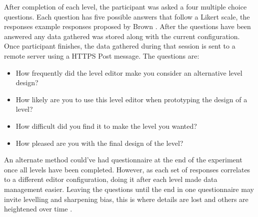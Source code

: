 \documentclass[journal]{IEEEtran}
\begin{document}
 After completion of each level, the participant was asked a four multiple choice questions. Each question  has five possible answers that follow a Likert scale, the responses example responses proposed by Brown \cite{brown2010likert}. After the questions have been answered any data gathered was stored along with the current configuration. Once participant finishes, the data gathered during that session is sent to a remote server using a HTTPS Post message.
 The questions are:
\begin{itemize}
    \item How frequently did the level editor make you consider an alternative level design?
    
    \item How likely are you to use this level editor when prototyping the design of a level?

   \item How difficult did you find it to make the level you wanted?

    \item How pleased are you with the final design of the level?
\end{itemize}
An alternate method could've had questionnaire at the end of the experiment once all levels have been completed. However, as each set of responses correlates to a different editor configuration, doing it after each level made data management easier. Leaving the questions until the end in one questionnaire may invite levelling and sharpening bias, this is where details are lost and others are heightened over time \cite{koriat2000toward}.  

\begin{table}[h]
	\centering
	\caption{Editor Settings}
	\label{settings}
	\def\arraystretch{2}
\end{table}
\end{document}
